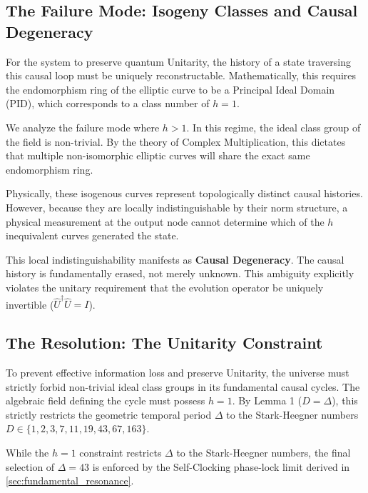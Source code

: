\subsection{The Failure Mode: Isogeny Classes and Causal Degeneracy}
For the system to preserve quantum Unitarity, the history of a state traversing this causal loop must be uniquely reconstructable. Mathematically, this requires the endomorphism ring of the elliptic curve to be a Principal Ideal Domain (PID), which corresponds to a class number of $h=1$.

We analyze the failure mode where $h > 1$. In this regime, the ideal class group of the field is non-trivial. By the theory of Complex Multiplication, this dictates that multiple non-isomorphic elliptic curves will share the exact same endomorphism ring. 

Physically, these isogenous curves represent topologically distinct causal histories. However, because they are locally indistinguishable by their norm structure, a physical measurement at the output node cannot determine which of the $h$ inequivalent curves generated the state. 

This local indistinguishability manifests as \textbf{Causal Degeneracy}. The causal history is fundamentally erased, not merely unknown. This ambiguity explicitly violates the unitary requirement that the evolution operator be uniquely invertible ($\hat{U}^\dagger \hat{U} = I$). 

\subsection{The Resolution: The Unitarity Constraint}
To prevent effective information loss and preserve Unitarity, the universe must strictly forbid non-trivial ideal class groups in its fundamental causal cycles. The algebraic field defining the cycle must possess $h = 1$. By Lemma 1 ($D=\Delta$), this strictly restricts the geometric temporal period $\Delta$ to the Stark-Heegner numbers $D \in \{1, 2, 3, 7, 11, 19, 43, 67, 163\}$. 

While the $h=1$ constraint restricts $\Delta$ to the Stark-Heegner numbers, the final selection of $\Delta = 43$ is enforced by the Self-Clocking phase-lock limit derived in \cref{sec:fundamental_resonance}.